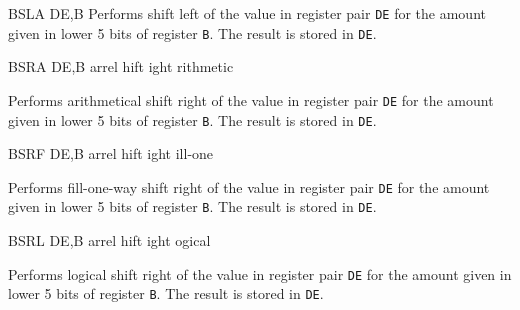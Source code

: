 \begin{basedescript}{
	\desclabelstyle{\multilinelabel}
	\desclabelwidth{3cm}}
\begin{DetailItem}{BSLA DE,B\ZXN}
		Performs shift left of the value in register pair {\tt DE} for the amount given in lower 5 bits of register {\tt B}. The result is stored in {\tt DE}.

		\begin{DetailEffects}
			\FlagsBSLA
		\end{DetailEffects}
		
		\begin{DetailTiming}
			\DetailTime{2}{8}
		\end{DetailTiming}

	\end{DetailItem}

	\begin{DetailItem}{BSRA DE,B\ZXN}
		{arrel hift ight rithmetic}
		{\SymBSRA}

		Performs arithmetical shift right of the value in register pair {\tt DE} for the amount given in lower 5 bits of register {\tt B}. The result is stored in {\tt DE}.

		\begin{DetailEffects}
			\FlagsBSRA
		\end{DetailEffects}
		
		\begin{DetailTiming}
		\end{DetailTiming}

	\end{DetailItem}

	\begin{DetailItem}{BSRF DE,B\ZXN}
		{arrel hift ight ill-one}
		{\SymBSRF}

		Performs fill-one-way shift right of the value in register pair {\tt DE} for the amount given in lower 5 bits of register {\tt B}. The result is stored in {\tt DE}.

		\begin{DetailEffects}
			\FlagsBSRF
		\end{DetailEffects}
		
		\begin{DetailTiming}
			\DetailTime{2}{8}
		\end{DetailTiming}

	\end{DetailItem}

	\begin{DetailItem}{BSRL DE,B\ZXN}
		{arrel hift ight ogical}
		{\SymBSRL}

		Performs logical shift right of the value in register pair {\tt DE} for the amount given in lower 5 bits of register {\tt B}. The result is stored in {\tt DE}.


\end{DetailItem}
\end{basedescript}

